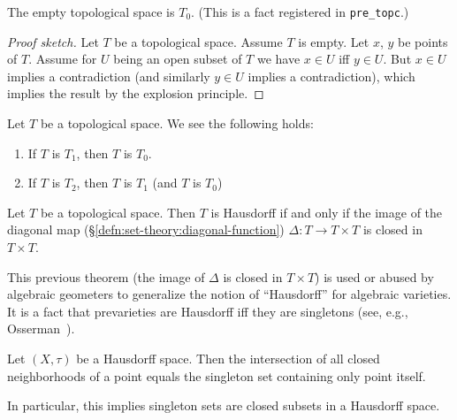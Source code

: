 \begin{example}
The empty topological space is $T_{0}$. (This is a fact registered in \texttt{pre\_topc}.)

\begin{proof}[Proof sketch]
Let $T$ be a topological space. Assume $T$ is empty.
Let $x$, $y$ be points of $T$. Assume for $U$ being an open subset of
$T$ we have $x\in U$ iff $y\in U$.
But $x\in U$ implies a contradiction (and similarly $y\in U$ implies a
contradiction), which implies the result by the explosion principle.
\end{proof}
\end{example}

\begin{theorem}
Let $T$ be a topological space. We see the following holds:
\begin{enumerate}
\item If $T$ is $T_{1}$, then $T$ is $T_{0}$.
\item If $T$ is $T_{2}$, then $T$ is $T_{1}$ (and $T$ is $T_{0}$)
\end{enumerate}
\end{theorem}

\begin{theorem}
Let $T$ be a topological space.
Then $T$ is Hausdorff if and only if the image of the diagonal map (\S\ref{defn:set-theory:diagonal-function}) $\Delta\colon T\to T\times T$
is closed in $T\times T$.
\end{theorem}

\begin{remark}
This previous theorem (the image of $\Delta$ is closed in $T\times T$)
is used or abused by algebraic geometers to generalize the notion of
``Hausdorff'' for algebraic varieties. It is a fact that prevarieties
are Hausdorff iff they are singletons (see, e.g.,
Osserman~\cite[ch.5]{osserman2021concise}). 
\end{remark}

\begin{theorem}
Let $(X,\tau)$ be a Hausdorff space. Then the intersection of all
closed neighborhoods of a point equals the singleton set containing
only point itself.

In particular, this implies singleton sets are closed subsets in a
Hausdorff space.
\end{theorem}

